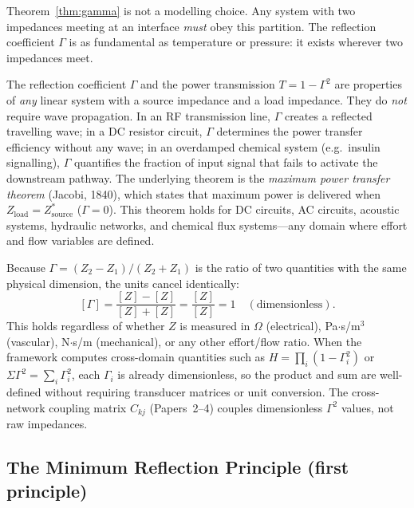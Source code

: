 \documentclass[aps,pre,twocolumn,superscriptaddress,floatfix]{revtex4-2}
\begin{document}
\noindent
Theorem~\ref{thm:gamma} is not a modelling choice.
Any system with two impedances meeting at an interface
\emph{must} obey this partition.
The reflection coefficient $\Gamma$ is as fundamental
as temperature or pressure: it exists wherever two
impedances meet.

\begin{remark}
\label{rem:wave-independence}
The reflection coefficient $\Gamma$ and the power
transmission $T = 1 - \Gamma^2$ are properties of
\emph{any} linear system with a source impedance
and a load impedance.
They do \emph{not} require wave propagation.
In an RF transmission line, $\Gamma$ creates a
reflected travelling wave;
in a DC resistor circuit, $\Gamma$ determines the
power transfer efficiency without any wave;
in an overdamped chemical system (e.g.\ insulin
signalling), $\Gamma$ quantifies the fraction of
input signal that fails to activate the downstream
pathway.
The underlying theorem is the
\emph{maximum power transfer theorem}
(Jacobi, 1840), which states that maximum power is
delivered when $Z_{\mathrm{load}} = Z_{\mathrm{source}}^*$
($\Gamma = 0$).
This theorem holds for DC circuits, AC circuits,
acoustic systems, hydraulic networks, and
chemical flux systems---any domain where
effort and flow variables are defined.
\end{remark}

\begin{remark}
\label{rem:dimensionless}
Because $\Gamma = (Z_2 - Z_1)/(Z_2 + Z_1)$
is the ratio of two quantities with the same
physical dimension, the units cancel identically:
\[
  [\Gamma] = \frac{[Z] - [Z]}{[Z] + [Z]}
  = \frac{[Z]}{[Z]} = 1
  \quad (\text{dimensionless}).
\]
This holds regardless of whether $Z$ is measured in
$\Omega$ (electrical), Pa$\cdot$s/m$^3$ (vascular),
N$\cdot$s/m (mechanical), or any other effort/flow
ratio.
When the framework computes cross-domain quantities
such as $H = \prod_i(1 - \Gamma_i^2)$ or
$\Sigma\Gamma^2 = \sum_i \Gamma_i^2$,
each $\Gamma_i$ is already dimensionless, so the
product and sum are well-defined without requiring
transducer matrices or unit conversion.
The cross-network coupling matrix $C_{kj}$
(Papers~2--4) couples dimensionless $\Gamma^2$
values, not raw impedances.
\end{remark}


\subsection{The Minimum Reflection Principle (first principle)}
\label{sec:mrp}
\end{document}
